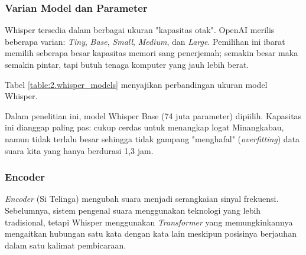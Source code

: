 \subsubsection{Varian Model dan Parameter}

Whisper tersedia dalam berbagai ukuran "kapasitas otak". OpenAI merilis beberapa varian: \textit{Tiny}, \textit{Base}, \textit{Small}, \textit{Medium}, dan \textit{Large}. Pemilihan ini ibarat memilih seberapa besar kapasitas memori sang penerjemah; semakin besar maka semakin pintar, tapi butuh tenaga komputer yang jauh lebih berat.

Tabel \ref{table:2.whisper_models} menyajikan perbandingan ukuran model Whisper. 

\begin{table}[H]
\centering
\caption{Spesifikasi dan Kebutuhan Sumber Daya Varian Model Whisper}
\label{table:2.whisper_models}
\end{table}

Dalam penelitian ini, model Whisper Base (74 juta parameter) dipiilih. Kapasitas ini dianggap paling pas: cukup cerdas untuk menangkap logat Minangkabau, namun tidak terlalu besar sehingga tidak gampang "menghafal" (\textit{overfitting}) data suara kita yang hanya berdurasi 1,3 jam.

\subsubsection{Encoder}

\textit{Encoder} (Si Telinga) mengubah suara menjadi serangkaian sinyal frekuensi. Sebelumnya, sistem pengenal suara menggunakan teknologi yang lebih tradisional, tetapi Whisper menggunakan \textit{Transformer} yang memungkinkannya mengaitkan hubungan satu kata dengan kata lain meskipun posisinya berjauhan dalam satu kalimat pembicaraan.

